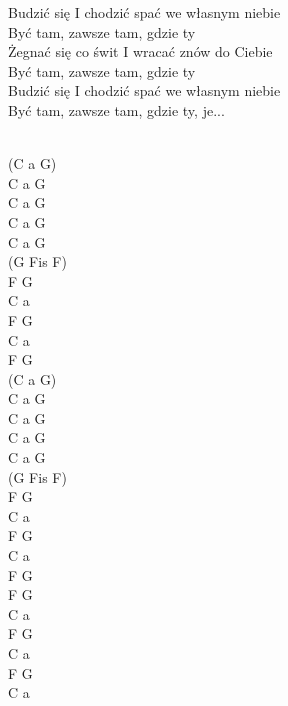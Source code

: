 \documentclass[a5paper, 10pt]{book}
\begin{document}
\begin{minipage}[t]{0.7\textwidth}
  \hspace*{4mm}Budzić się I chodzić spać we własnym niebie\\
  \hspace*{4mm}Być tam, zawsze tam, gdzie ty\\
  \hspace*{4mm}Żegnać się co świt I wracać znów do Ciebie\\
  \hspace*{4mm}Być tam, zawsze tam, gdzie ty\\
  \hspace*{4mm}Budzić się I chodzić spać we własnym niebie\\
  \hspace*{4mm}Być tam, zawsze tam, gdzie ty, je...\\
  \\
\end{minipage}
\begin{minipage}[t]{0.3\textwidth}
  (C a G)\\
  C a G\\
  C a G\\
  C a G\\
  C a G\\
  (G Fis F)\\
  F G\\
  C a\\
  F G\\
  C a\\
  F G\\
  (C a G)\\
  C a G\\
  C a G\\
  C a G\\
  C a G\\
  (G Fis F)\\
  F G\\
  C a\\
  F G\\
  C a\\
  F G\\
  F G\\
  C a\\
  F G\\
  C a\\
  F G\\
  C a\\
\end{minipage}

\end{document}

